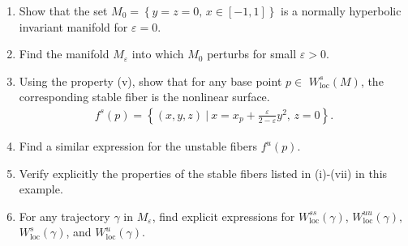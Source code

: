 \begin{ex}
\begin{exercise}
\begin{enumerate}[label=(\alph*)]
	\item Show that the set $M_{0}=\left\{ y=z=0,\,x\in\left[-1,1\right]\right\} $
is a normally hyperbolic invariant manifold for $\varepsilon=0.$

\item Find the manifold $M_{\varepsilon}$ into which $M_{0}$ perturbs
for small $\varepsilon>0$.

\item Using the property (v), show that for any base point $p\in$ $W_{\mathrm{loc}}^{s}(M)$,
the corresponding stable fiber is the nonlinear surface.
\begin{align}
f^{s}(p)=\left\{ \left(x,y,z\right)~|~x=x_{p}+\frac{\varepsilon}{2-\varepsilon}y^{2},\,z=0\right\} .
\end{align}

\item Find a similar expression for the unstable fibers $f^{u}(p)$.

\item Verify explicitly the properties of the stable fibers listed in
(i)-(vii) in this example.

\item For any trajectory $\gamma$ in $M_{\varepsilon}$, find explicit
expressions for $W_{\mathrm{loc}}^{ss}(\gamma)$, $W_{\mathrm{loc}}^{uu}(\gamma),$
$W_{\mathrm{loc}}^{s}(\gamma)$, and $W_{\mathrm{loc}}^{u}(\gamma).$ 
\end{enumerate}
\end{exercise}


\end{ex}

